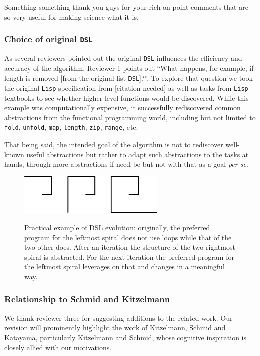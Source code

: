 \documentclass{article}
\begin{document}
Something something thank you guys for your rich on point comments that are so
very useful for making science what it is.

\subsubsection*{Choice of original \texttt{DSL}}

As several reviewers pointed out the original \texttt{DSL} influences the efficiency and
accuracy of the algorithm. Reviewer 1 points out ``What happens, for example, if
length is removed [from the original list \texttt{DSL}]?''. To explore that question we
took the original \texttt{Lisp} specification from [citation needed] as well as
tasks from \texttt{Lisp} textbooks to see whether higher level functions would
be discovered. While this example was computationally expensive, it successfully
rediscovered common abstractions from the functional programming world,
including but not limited to \texttt{fold}, \texttt{unfold}, \texttt{map},
\texttt{length}, \texttt{zip}, \texttt{range}, etc.

That being said, the intended goal of the algorithm is not to rediscover
well-known useful abstractions but rather to adapt such abstractions to the
tasks at hands, through more abstractions if need be but not with that as a goal
\textit{per se}.

\begin{figure}
  \centering
  \includegraphics[width=7cm]{figures/rebutal/spirals.eps}\label{geomCompiled}
  \caption{Practical example of DSL evolution: originally, the preferred program
  for the leftmost spiral does not use loops while that of the two other does.
  After an iteration the structure of the two rightmost spiral is abstracted.
  For the next iteration the preferred program for the leftmost spiral leverages
  on that and changes in a meaningful way.}
\end{figure}

\subsubsection*{Relationship to Schmid and Kitzelmann}

We thank reviewer three for suggesting additions to the related work. Our
revision will prominently highlight the work of Kitzelmann, Schmid and Katayama,
particularly Kitzelmann and Schmid, whose cognitive inspiration
is closely allied with our motivations.
\end{document}
